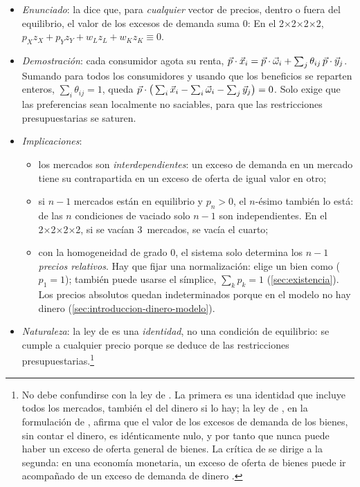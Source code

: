 \documentclass[11pt]{article}
\begin{document}
\begin{itemize}
\item \emph{Enunciado}: la  dice que, para \emph{cualquier} vector de precios, dentro o fuera del equilibrio, el valor de los excesos de demanda suma 0:
  En el 2×2×2×2, $p_Xz_X+p_Yz_Y+w_Lz_L+w_Kz_K\equiv 0$.
\item \emph{Demostración}: cada consumidor agota su renta, $\vec{p}\cdot\vec{x}_i=\vec{p}\cdot\vec{\omega}_i+\sum_j\theta_{ij}\,\vec{p}\cdot\vec{y}_j$. Sumando para todos los consumidores y usando que los beneficios se reparten enteros, $\sum_i\theta_{ij}=1$, queda $\vec{p}\cdot\big(\sum_i\vec{x}_i-\sum_i\vec{\omega}_i-\sum_j\vec{y}_j\big)=0$. Solo exige que las preferencias sean localmente no saciables, para que las restricciones presupuestarias se saturen.\findemo
\item \emph{Implicaciones}:
  \begin{itemize}
  \item los mercados son \emph{interdependientes}: un exceso de demanda en un mercado tiene su contrapartida en un exceso de oferta de igual valor en otro;
  \item si $n-1$ mercados están en equilibrio y $p_n>0$, el $n$-ésimo también lo está: de las $n$ condiciones de vaciado solo $n-1$ son independientes. En el 2×2×2×2, si se vacían 3~mercados, se vacía el cuarto;
  \item con la homogeneidad de grado 0, el sistema solo determina los $n-1$ \emph{precios relativos}. Hay que fijar una normalización:  elige un bien como  ($p_1=1$); también puede usarse el símplice, $\sum_kp_k=1$ (\ref{sec:existencia}). Los precios absolutos quedan indeterminados porque en el modelo no hay dinero (\ref{sec:introduccion-dinero-modelo}).
  \end{itemize}
\item \emph{Naturaleza}: la ley de  es una \emph{identidad}, no una condición de equilibrio: se cumple a cualquier precio porque se deduce de las restricciones presupuestarias.\footnote{No debe confundirse con la ley de . La primera es una identidad que incluye todos los mercados, también el del dinero si lo hay; la ley de , en la formulación de \textcite{Lange1942Say}, afirma que el valor de los excesos de demanda de los bienes, sin contar el dinero, es idénticamente nulo, y por tanto que nunca puede haber un exceso de oferta general de bienes. La crítica de  se dirige a la segunda: en una economía monetaria, un exceso de oferta de bienes puede ir acompañado de un exceso de demanda de dinero\nocite{BeckerBaumol1952Classical}  .}
\end{itemize}
\end{document}

